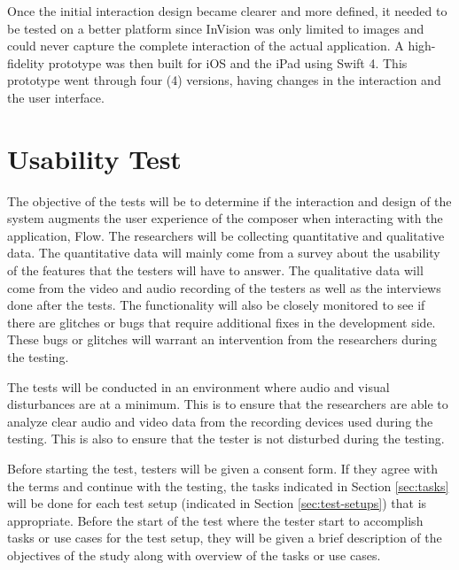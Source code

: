 		Once the initial interaction design became clearer and more defined, it needed to be tested on a better platform since InVision was only limited to images and could never capture the complete interaction of the actual application. A high-fidelity prototype was then built for iOS and the iPad using Swift 4. This prototype went through four (4) versions, having changes in the interaction and the user interface. 

	\section{Usability Test}

		The objective of the tests will be to determine if the interaction and design of the system augments the user experience of the composer when interacting with the application, Flow. The researchers will be collecting quantitative and qualitative data. The quantitative data will mainly come from a survey  about the usability of the features that the testers will have to answer. The qualitative data will come from the video and audio recording of the testers as well as the interviews done after the tests. The functionality will also be closely monitored to see if there are glitches or bugs that require additional fixes in the development side. These bugs or glitches will warrant an intervention from the researchers during the testing. 

		The tests will be conducted in an environment where audio and visual disturbances are at a minimum. This is to ensure that the researchers are able to analyze clear audio and video data from the recording devices used during the testing. This is also to ensure that the tester is not disturbed during the testing. 


		Before starting the test, testers will be given a consent form. If they agree with the terms and continue with the testing, the tasks indicated in Section \ref{sec:tasks} will be done for each test setup (indicated in Section \ref{sec:test-setups}) that is appropriate. Before the start of the test where the tester start to accomplish tasks or use cases for the test setup, they will be given a brief description of the objectives of the study along with overview of the tasks or use cases. 


